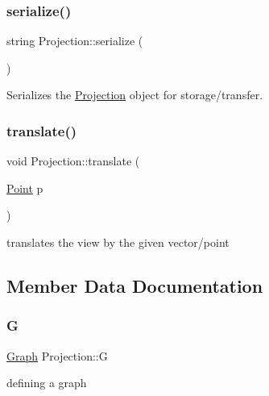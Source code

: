 \subsubsection{\texorpdfstring{serialize()}{serialize()}}
{\footnotesize\ttfamily string Projection\+::serialize (\begin{DoxyParamCaption}{ }\end{DoxyParamCaption})}



Serializes the \mbox{\hyperlink{class_projection}{Projection}} object for storage/transfer. 

\mbox{\label{class_projection_ae8e33f2b836aff2c24b148c1308f1789}} 
\subsubsection{\texorpdfstring{translate()}{translate()}}
{\footnotesize\ttfamily void Projection\+::translate (\begin{DoxyParamCaption}\item[{\mbox{\hyperlink{class_point}{Point}}}]{p }\end{DoxyParamCaption})}



translates the view by the given vector/point 



\subsection{Member Data Documentation}
\mbox{\label{class_projection_a60e6ed7cb3fbdf833d22bbfaa044be42}} 
\subsubsection{\texorpdfstring{G}{G}}
{\footnotesize\ttfamily \mbox{\hyperlink{class_graph}{Graph}} Projection\+::G}



defining a graph 

\mbox{\label{class_projection_a2fdb6f244ddff5e2201c62df694aaae4}} 
